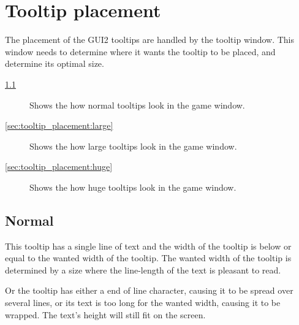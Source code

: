 \section{Tooltip placement}
\label{sec:tooltip_placement}


The placement of the GUI2 tooltips are handled by the tooltip window. This
window needs to determine where it wants the tooltip to be placed, and
determine its optimal size.

\begin{description}
\item[\cref{sec:tooltip_placement:normal}]
	Shows the how normal tooltips look in the game window.

\item[\cref{sec:tooltip_placement:large}]
	Shows the how large tooltips look in the game window.

\item[\cref{sec:tooltip_placement:huge}]
	Shows the how huge tooltips look in the game window.

\end{description}


\subsection{Normal}
\label{sec:tooltip_placement:normal}

This tooltip has a single line of text and the width of the tooltip is below or
equal to the wanted width of the tooltip. The wanted width of the tooltip is
determined by a size where the line-length of the text is pleasant to read.

Or the  tooltip has either a end of line character, causing it to be spread
over several lines, or its text is too long for the wanted width, causing it to
be wrapped. The text's height will still fit on the screen.

